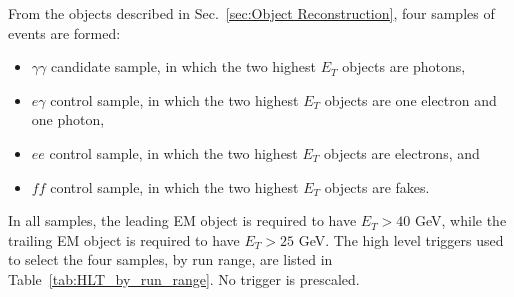 \documentclass[dissertation.tex]{subfiles}
\begin{document}
From the objects described in Sec.~\ref{sec:Object Reconstruction}, four samples of events are formed:

\begin{itemize}
\item $\gamma\gamma$ candidate sample, in which the two highest $E_{T}$ objects are photons,
\item $e\gamma$ control sample, in which the two highest $E_{T}$ objects are one electron and one photon,
\item $ee$ control sample, in which the two highest $E_{T}$ objects are electrons, and
\item $\mathit{ff}$ control sample, in which the two highest $E_{T}$ objects are fakes.
\end{itemize}
%
In all samples, the leading EM object is required to have $E_{T} > 40$ GeV, while the trailing EM object is required to have $E_{T} > 25$ GeV.  The high level triggers used to select the four samples, by run range, are listed in Table~\ref{tab:HLT_by_run_range}.  No trigger is prescaled.
\end{document}
